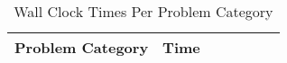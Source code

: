 \begin{table}[H]
\caption{Wall Clock Times Per Problem Category}
\begin{center}
\scalebox{0.8} %
{
\begin{tabular}{lrrrrrr}
\hline
Problem Category & Time \\
\hline


\end{tabular}
}
\end{center}
\end{table}

